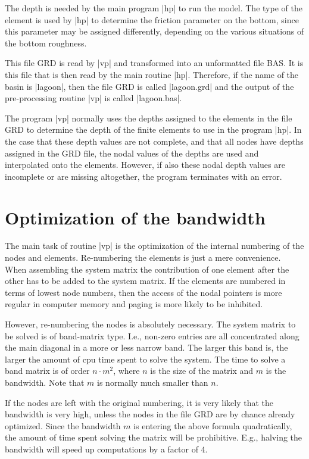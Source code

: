 \documentclass{report}
\begin{document}
The depth is needed by the main program |hp| to run the model.
The type of the element is used by |hp| to determine
the friction parameter on the bottom, since this parameter
may be assigned differently, depending on the various situations
of the bottom roughness.

This file GRD is read by |vp| and transformed into an
unformatted file BAS. It is this file that is then read
by the main routine |hp|. Therefore, if the name of the
basin is |lagoon|, then the file GRD is called |lagoon.grd|
and the output of the pre-processing routine |vp| is
called |lagoon.bas|.

The program |vp| normally uses the depths assigned to the
elements in the file GRD to determine the depth of the
finite elements to use in the program |hp|. In the case
that these depth values are not complete, and that all nodes
have depths assigned in the GRD file, the nodal values of the
depths are used and interpolated onto the elements. However,
if also these nodal depth values are incomplete or are missing
altogether, the program terminates with an error.

\section{Optimization of the bandwidth}

The main task of routine |vp| is the optimization of the 
internal numbering of the nodes and elements.
Re-numbering the elements is just a mere convenience. When
assembling the system matrix the contribution of
one element after the other has to be added to the system matrix.
If the elements are numbered in terms of lowest node numbers,
then the access of the nodal pointers is more regular in 
computer memory and paging is more likely to be inhibited.

However, re-numbering the nodes is absolutely necessary.
The system matrix to be solved is of band-matrix type.
I.e., non-zero entries are all concentrated along the
main diagonal in a more or less narrow band. The larger this
band is, the larger the amount of cpu time spent to
solve the system. The time to solve a band matrix
is of order $n \cdot m^2$, where $n$ is the size of the
matrix and $m$ is the bandwidth. Note that $m$ is normally
much smaller than $n$.

If the nodes are left with the original numbering, it is very likely
that the bandwidth is very high, unless the nodes in the
file GRD are by chance already optimized. Since the bandwidth $m$
is entering the above formula quadratically, the amount
of time spent solving the matrix will be prohibitive.
E.g., halving the bandwidth will speed up computations by
a factor of 4.
\end{document}
